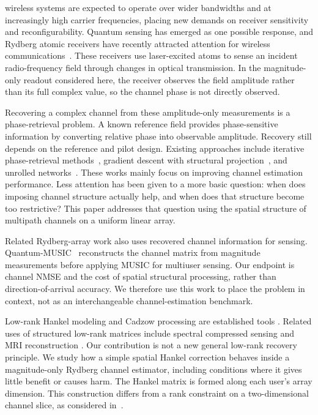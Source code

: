 \documentclass[journal]{IEEEtran}
\begin{document}
 wireless systems are expected to operate
over wider bandwidths and at increasingly high carrier frequencies, placing
new demands on receiver sensitivity and reconfigurability. Quantum sensing has
emerged as one possible response, and Rydberg atomic receivers have recently
attracted attention for wireless communications~\cite{cui2025,gong2025mag}.
These receivers use laser-excited atoms to sense an incident radio-frequency
field through changes in optical transmission. In the magnitude-only readout considered here, the receiver observes the
field amplitude rather than its full complex value, so the channel phase
is not directly observed.

Recovering a complex channel from these amplitude-only measurements is a
phase-retrieval problem. A known reference field provides phase-sensitive information
by converting relative phase into observable amplitude. Recovery still
depends on the reference and pilot design. Existing approaches
include iterative phase-retrieval methods~\cite{gerchberg1972}, gradient
descent with structural projection~\cite{xu2025}, and unrolled
networks~\cite{xiao2026}. These works mainly focus on improving channel
estimation performance. Less attention has been given to a more basic
question: when does imposing channel structure actually help, and when does
that structure become too restrictive? This paper addresses that question
using the spatial structure of multipath channels on a uniform linear array.

Related Rydberg-array work also uses recovered channel information for
sensing. Quantum-MUSIC~\cite{kim2025quantummusic} reconstructs the channel
matrix from magnitude measurements before applying MUSIC for multiuser
sensing. Our endpoint is channel NMSE and the cost of spatial structural
processing, rather than direction-of-arrival accuracy. We therefore use
this work to place the problem in context, not as an interchangeable
channel-estimation benchmark.

Low-rank Hankel modeling and Cadzow processing are established tools
\cite{cadzow1988,markovsky2008}. Related uses of structured low-rank
matrices include spectral compressed sensing and MRI reconstruction
\cite{chen2014emac,jin2016aloha,haldar2014loraks}. Our contribution is not
a new general low-rank recovery principle. We study how a simple spatial
Hankel correction behaves inside a magnitude-only Rydberg channel
estimator, including conditions where it gives little benefit or causes
harm. The Hankel matrix is formed along each user's array dimension.
This construction differs from a rank constraint on a two-dimensional
channel slice, as considered in~\cite{xu2025}.
\end{document}
